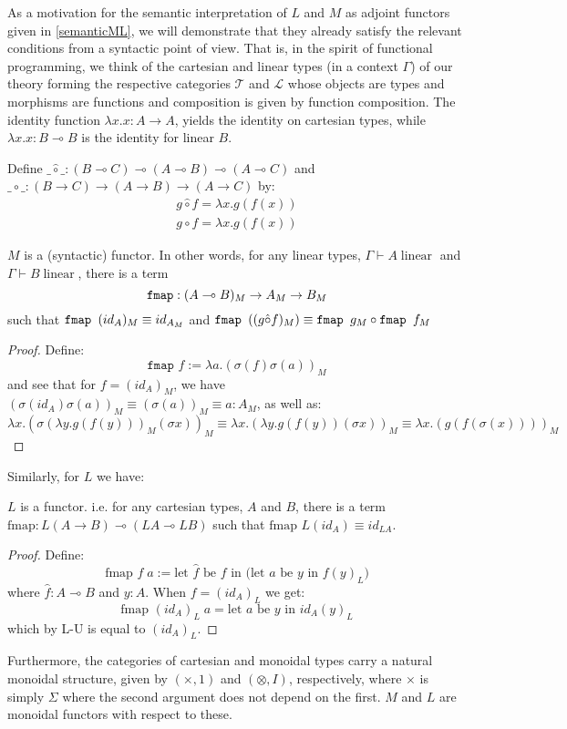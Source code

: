 \documentclass[a4paper,english]{lipics-v2018}
\DeclareMathOperator{\linear}{\text{ linear}}
\begin{document}
As a motivation for the semantic interpretation of $L$ and $M$ as adjoint functors given in \ref{semanticML}, we will demonstrate that they already satisfy the relevant conditions from a syntactic point of view. That is, in the spirit of functional programming, we think of the cartesian and linear types (in a context $\Gamma$) of our theory forming the respective categories $\mathcal{T}$ and $\mathcal{L}$ whose objects are types and morphisms are functions and composition is given by function composition. The identity function $\lambda x. x : A \to A$, yields the identity on cartesian types, while $\lambda x.x : B \multimap B$ is the identity for linear $B$.
\begin{definition}\label{syntcomp}Define $\_\hat \circ\_ : (B \multimap C) \multimap (A \multimap B) \multimap (A \multimap C)$ and $\_ \circ\_ : (B \to C) \to (A \to B) \to (A \to C)$ by:
  \[
    \begin{split}
    g \hat \circ f = \lambda x. g(f(x))\\
    g \circ f = \lambda x. g(f(x))
    \end{split}
  \]
\end{definition}

\begin{theorem}\label{Mfunc}
  $M$ is a (syntactic) functor. In other words, for any linear types, $\Gamma \vdash A \linear$ and $\Gamma \vdash B \linear$, there is a term
\[
  \textup{\texttt{fmap}} : (A \multimap B)_M \to A_M \to B_M
  \]
such that $\textup{\texttt{fmap }} (id_A)_M \equiv id_{A_M}$ and $\textup{\texttt{fmap }} ((g \hat \circ f)_M) \equiv \textup{\texttt{fmap }} g_M \circ \textup{\texttt{fmap }} f_M$
  \begin{proof}
  Define:
  \[
    \texttt{fmap }f := \lambda a. (\sigma(f)\sigma(a))_M
  \]
  and see that for $f = (id_A)_M$, we have $(\sigma(id_A)\sigma(a))_M \equiv (\sigma(a))_M \equiv a : A_M$, as well as:
  \[
    \lambda x. (\sigma(\lambda y. g(f(y)))_M(\sigma x))_M \equiv \lambda x. (\lambda y. g(f(y))(\sigma x))_M \equiv \lambda x. (g(f(\sigma(x))))_M
  \]
\end{proof}
\end{theorem}
Similarly, for $L$ we have:
\begin{theorem}
  $L$ is a functor. i.e. for any cartesian types, $A$ and $B$, there is a term $\text{fmap} : L(A \to B) \multimap (LA \multimap LB)$ such that $\text{fmap } L(id_A) \equiv id_{LA}$.
  \begin{proof}
  Define:
  \[
    \text{fmap } f \; a := \text{let $\hat f$ be $f$ in (let $a$ be $y$ in $f(y)_L$)}
  \]
  where $\hat f : A \multimap B$ and $y : A$. When $f = (id_A)_L$ we get:
  \[
    \text{fmap } (id_A)_L \; a = \text{let $a$ be $y$ in $id_A(y)_L$}
  \]
  which by L-U is equal to $(id_A)_L$.
\end{proof}
\end{theorem}
Furthermore, the categories of cartesian and monoidal types carry a natural monoidal structure, given by $(\times, 1)$ and $(\otimes, I)$, respectively, where $\times$ is simply $\Sigma$ where the second argument does not depend on the first. $M$ and $L$ are monoidal functors with respect to these.
\end{document}

